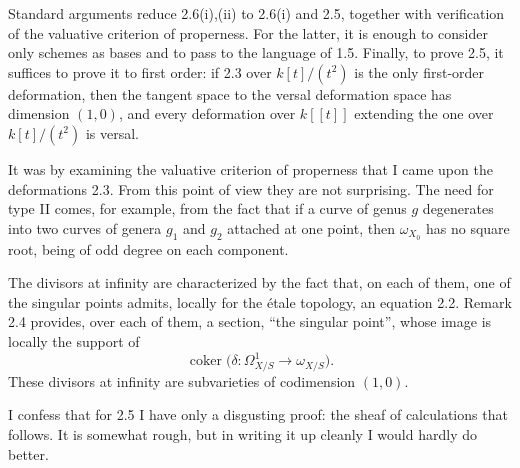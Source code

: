 \documentclass[11pt]{article}
\newcommand{\coker}{\operatorname{coker}}
\begin{document}
Standard arguments reduce 2.6(i),(ii) to 2.6(i) and 2.5, together with verification of the valuative criterion of properness. For the latter, it is enough to consider only schemes as bases and to pass to the language of 1.5. Finally, to prove 2.5, it suffices to prove it to first order: if 2.3 over $k[t]/(t^2)$ is the only first-order deformation, then the tangent space to the versal deformation space has dimension $(1,0)$, and every deformation over $k[[t]]$ extending the one over $k[t]/(t^2)$ is versal.

It was by examining the valuative criterion of properness that I came upon the deformations 2.3. From this point of view they are not surprising. The need for type II comes, for example, from the fact that if a curve of genus $g$ degenerates into two curves of genera $g_1$ and $g_2$ attached at one point, then $\omega_{X_0}$ has no square root, being of odd degree on each component.

The divisors at infinity are characterized by the fact that, on each of them, one of the singular points admits, locally for the étale topology, an equation 2.2. Remark 2.4 provides, over each of them, a section, ``the singular point'', whose image is locally the support of
\[
  \coker\bigl(\delta:\Omega^1_{X/S}\longrightarrow\omega_{X/S}\bigr).
\]
These divisors at infinity are subvarieties of codimension $(1,0)$.

I confess that for 2.5 I have only a disgusting proof: the sheaf of calculations that follows. It is somewhat rough, but in writing it up cleanly I would hardly do better.
\end{document}
